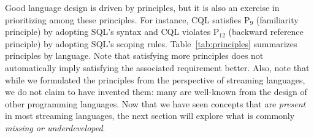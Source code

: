 Good language design is driven by principles, but it is also an
exercise in prioritizing among these principles. For instance, CQL
satisfies P$_9$ (familiarity principle) by adopting SQL's syntax and
CQL violates P$_{12}$ (backward reference principle) by adopting SQL's
scoping rules. Table~\ref{tab:principles} summarizes principles by
language. Note that satisfying more principles does not automatically
imply satisfying the associated requirement better. Also, note that while
we formulated the principles from the perspective of streaming
languages, we do not claim to have invented them: many are well-known
from the design of other programming languages. Now that we have seen
concepts that are \emph{present} in most streaming languages, the next
section will explore what is commonly \emph{missing or
  underdeveloped}.
